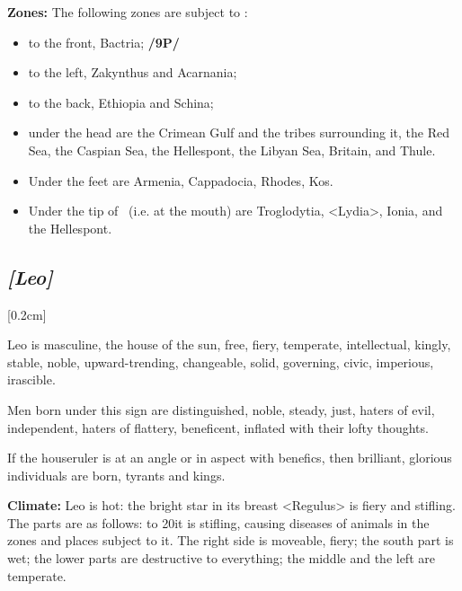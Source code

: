 \textbf{Zones:} The following zones are subject to \Cancer: 
\begin{itemize}
\item to the front, Bactria; \textbf{/9P/}
\item to the left, Zakynthus and Acarnania; 
\item to the back, Ethiopia and Schina;
\item under the head are the Crimean Gulf and the tribes surrounding it, the Red Sea, the Caspian Sea, the Hellespont, the Libyan Sea, Britain, and Thule. 
\item Under the feet are Armenia, Cappadocia, Rhodes, Kos. \item Under the tip of \Cancer\, (i.e. at the mouth) are Troglodytia, <Lydia>, Ionia, and the Hellespont.
\end{itemize}

\secbr
\subsection{\textit{[Leo]}}
[0.2cm]

 Leo is masculine, the house of the sun, free,  fiery, temperate, intellectual, kingly, stable, noble, upward-trending, changeable,  solid, governing, civic, imperious, irascible.

Men born under this sign are distinguished, noble, steady, just, haters of evil, independent, haters of flattery, beneficent, inflated with their lofty thoughts. 

\mndl[0.2cm]
If the houseruler is at an angle or in aspect with benefics, then brilliant, glorious individuals are born, tyrants and kings.

\textbf{Climate:} Leo is hot: the bright star in its breast <Regulus> is fiery and stifling. The parts are as follows: to 20\deg it is stifling, causing diseases of animals in the zones and places subject to it. The right side is moveable,
fiery; the south part is wet; the lower parts are destructive to everything; the middle and the left are temperate.

